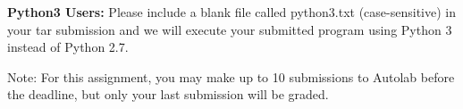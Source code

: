  \begin{notebox}
  {\bf Python3 Users:} Please include a blank file called python3.txt (case-sensitive) in your tar submission and we will execute your submitted program using Python 3 instead of Python 2.7.
 \end{notebox}

Note: For this assignment, you may make up to 10 submissions to Autolab before the deadline, but only your last submission will be graded.

    
    
    



